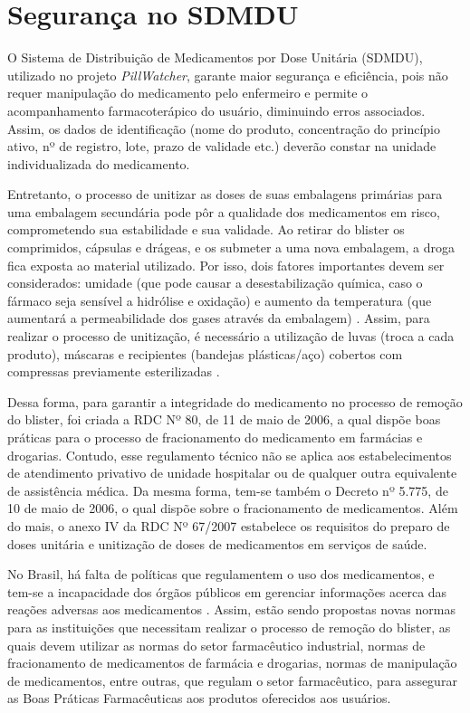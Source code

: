 \section{Segurança no SDMDU}

O Sistema de Distribuição de Medicamentos por Dose Unitária (SDMDU), utilizado no projeto \textit{PillWatcher}, garante maior segurança e eficiência, pois não requer manipulação do medicamento pelo enfermeiro e permite o acompanhamento farmacoterápico do usuário, diminuindo erros associados. Assim, os dados de identificação (nome do produto, concentração do princípio ativo, nº de registro, lote, prazo de validade etc.) deverão constar na unidade individualizada do medicamento.

Entretanto, o processo de unitizar as doses de suas embalagens primárias para uma embalagem secundária pode pôr a qualidade dos medicamentos em risco, comprometendo sua estabilidade e sua validade. Ao retirar do blister os comprimidos, cápsulas e drágeas, e os submeter a uma nova embalagem, a droga fica exposta ao material utilizado. Por isso, dois fatores importantes devem ser considerados: umidade (que pode causar a desestabilização química, caso o fármaco seja sensível a hidrólise e oxidação) e aumento da temperatura (que aumentará a permeabilidade dos gases através da embalagem) \cite{Jara_2012}. Assim, para realizar o processo de unitização, é necessário a utilização de luvas (troca a cada produto), máscaras e recipientes (bandejas plásticas/aço) cobertos com compressas previamente esterilizadas \cite{Everton_2012}. 

Dessa forma, para garantir a integridade do medicamento no processo de remoção do blister, foi criada a RDC Nº 80, de 11 de maio de 2006, a qual dispõe boas práticas para o processo de fracionamento do medicamento em farmácias e drogarias. Contudo, esse regulamento técnico não se aplica aos estabelecimentos de atendimento privativo de unidade hospitalar ou de qualquer outra equivalente de assistência médica. Da mesma forma, tem-se também o Decreto nº 5.775, de 10 de maio de 2006, o qual dispõe sobre o fracionamento de medicamentos. Além do mais, o anexo IV da RDC Nº 67/2007 estabelece os requisitos do preparo de doses unitária e unitização de doses de medicamentos em serviços de saúde.

No Brasil, há falta de políticas que regulamentem o uso dos medicamentos, e tem-se a incapacidade dos órgãos públicos em gerenciar informações acerca das reações adversas aos medicamentos \cite{Jara_2012}. Assim, estão sendo propostas novas normas para as instituições que necessitam realizar o processo de remoção do blister, as quais devem utilizar as normas do setor farmacêutico industrial, normas de fracionamento de medicamentos de farmácia e drogarias, normas de manipulação de medicamentos, entre outras, que regulam o setor farmacêutico, para assegurar as Boas Práticas Farmacêuticas aos produtos oferecidos aos usuários. 




